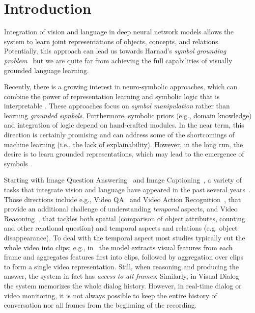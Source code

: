 \section{Introduction}

Integration of vision and language in deep neural network models allows the system to learn joint representations of objects, concepts, and relations.  Potentially, this approach can lead us towards Harnad's \textit{symbol grounding problem}~\cite{harnad2003symbol} but we are quite far from achieving the full capabilities of visually grounded language learning.

Recently, there is a growing interest in neuro-symbolic approaches, which can combine the power of representation learning and symbolic logic that is interpretable \cite{mao2019neurosymbolic}. These approaches focus on \textit{symbol manipulation} rather than learning \textit{grounded symbols}.  Furthermore, symbolic priors (e.g., domain knowledge) and integration of logic depend on hand-crafted modules.  In the near term, this direction is certainly promising and can address some of the shortcomings of machine learning (i.e., the lack of explainability)\cite{vedantam2019probabilistic}.  However, in the long run, the desire is to learn grounded representations, which may lead to the emergence of symbols \cite{taniguchi2018symbol}.

Starting with Image Question Answering~\cite{malinowski2014multi,antol2015} and Image Captioning~\cite{karpathy2015deep}, a variety of tasks that integrate vision and language have appeared in the past several years~\cite{mogadala2019trends}. 
Those directions include e.g., Video QA~\cite{MovieQA} and Video Action Recognition~\cite{monfort2019moments}, that provide an additional challenge of understanding \emph{temporal} aspects, and Video Reasoning~\cite{song2018explore,yang2018dataset}, that tackles both spatial (comparison of object attributes, counting and other relational question) and temporal aspects and relations (e.g. object disappearance).
To deal with the temporal aspect most studies typically cut the whole video into clips; e.g., in~\cite{song2018explore} the model extracts visual features from each frame and aggregates features first into clips, followed by aggregation over clips to form a single video representation.
Still, when reasoning and producing the answer, the system in fact has \textit{access to all frames}. 
Similarly, in Visual Dialog~\cite{das2017visual} the system memorizes the whole dialog history.
However, in real-time dialog or video monitoring, it is not always possible to keep the entire history of conversation nor all frames from the beginning of the recording.  



